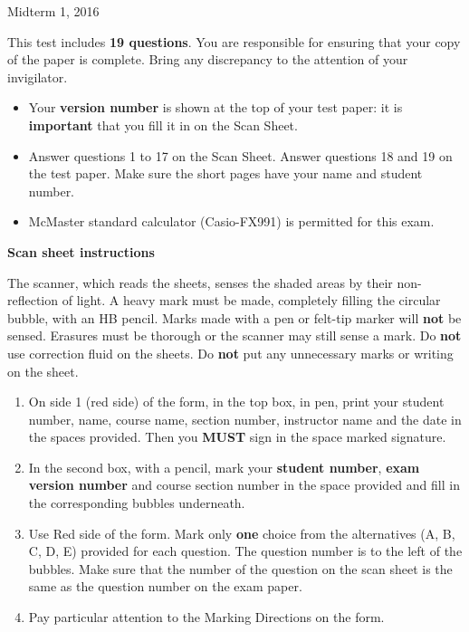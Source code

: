 \documentclass[12pt]{article}
\begin{document}
{ \par}
{\centering Midterm 1, 2016 \par}

\parindent0pt

\vfill

This test includes {\bf 19 questions}. You are responsible for ensuring that your copy of the paper is complete. Bring any discrepancy to the attention of your invigilator. 

\vfill

\begin{itemize}
\item Your \textbf{version number} is shown at the top of your test paper: it is \textbf{important} that you fill it in on the Scan Sheet.
\item Answer questions 1 to 17 on the Scan Sheet. Answer questions 18 and 19 on the test paper. Make sure the short pages have your name and student number.
\item McMaster standard calculator (Casio-FX991) is permitted for this exam.
\end{itemize}

\vfill

\textbf{Scan sheet instructions}

\small{
The scanner, which reads the sheets, senses the shaded areas by their non-reflection of light. A heavy mark must be made, completely filling the circular bubble, with an HB pencil. Marks made with a pen or felt-tip marker will \textbf{not} be sensed. Erasures must be thorough or the scanner may still sense a mark. Do \textbf{not} use correction fluid on the sheets. Do \textbf{not} put any unnecessary marks or writing on the sheet.

\begin{enumerate}
\item On side 1 (red side) of the form, in the top box, in pen, print your student number, name, course name, section number, instructor name and the date in the spaces provided. Then you {\bf MUST} sign in the space marked signature.

\item In the second box, with a pencil, mark your {\bf student number}, {\bf exam version number} and course section number in the space provided and fill in the corresponding bubbles underneath.

\item Use Red side of the form. Mark only {\bf one} choice from the alternatives (A, B, C, D, E) provided for each question. The question number is to the left of the bubbles. Make sure that the number of the question on the scan sheet is the same as the question number on the exam paper.
\item  Pay particular attention to the Marking Directions on the form.
\end{enumerate}
}

\vfill
{ \par}
\end{document}

